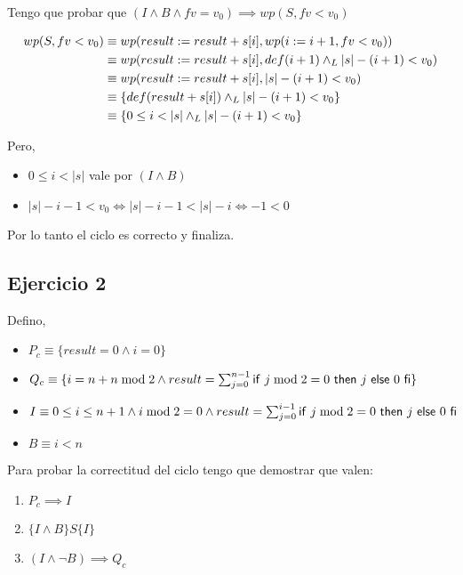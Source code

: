 Tengo que probar que $ (I \wedge B \wedge fv = v_0) \implies wp(S, fv < v_0) $

\begin{align*}
    wp(S, fv < v_0) &\equiv wp(result := result + s[i], wp(i := i+1, fv < v_0)) \\
    &\equiv wp(result := result + s[i], def(i+1) \land _L |s| - (i+1) < v_0) \\
    &\equiv wp(result := result + s[i], |s| - (i+1) < v_0) \\
    &\equiv \{def(result + s[i]) \land _L |s| - (i+1) < v_0 \} \\
    &\equiv \{ 0 \leq i < |s| \land _L |s| - (i+1) < v_0 \} \\
\end{align*}

Pero,
\begin{itemize}
    \item $ 0 \leq i < |s| $ vale por $ ( I \wedge B ) $
    \item $ |s| - i - 1 < v_0 \iff |s| - i - 1 < |s| - i \iff -1 < 0 $
\end{itemize}

Por lo tanto el ciclo es correcto y finaliza.

\subsection{Ejercicio 2}

Defino,
\begin{itemize}
    \item $ P_c \equiv \{ result = 0 \wedge i = 0 \} $
    \item $ Q_c \equiv \{ i = n+n \bmod 2 \wedge result = \sum_{j = 0}^{n-1}\mathsf{if}\ j \bmod 2 = 0\ \mathsf{then}\ j\ \mathsf{else}\ 0\ \mathsf{fi} \} $
    \item $ I \equiv 0 \leq i \leq n+1 \wedge i \bmod 2 = 0\wedge result = \sum_{j = 0}^{i-1}\mathsf{if}\ j \bmod 2 = 0\ \mathsf{then}\ j\ \mathsf{else}\ 0\ \mathsf{fi} $
    \item $ B \equiv i < n $
\end{itemize}

Para probar la correctitud del ciclo tengo que demostrar que valen:
\begin{enumerate}[label=(\alph*)]
    \item $ P_c \implies I $
    \item $ \{ I \wedge B \} S \{ I \} $
    \item $ (I \wedge \neg B) \implies Q_c $
\end{enumerate}

